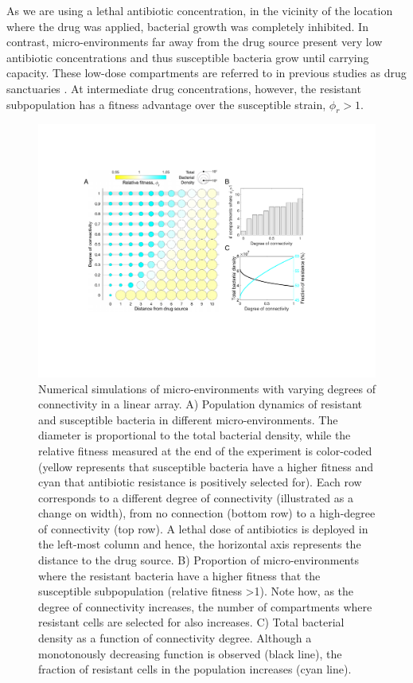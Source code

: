 \documentclass[fleqn,12pt]{wlscirep}
\begin{document}
As we are using a lethal antibiotic concentration, in the vicinity of the location where the drug was applied, bacterial growth was completely inhibited. In contrast, micro-environments far away from the drug source present very low antibiotic concentrations and thus susceptible bacteria grow until carrying capacity. These low-dose compartments are referred to in previous studies as drug sanctuaries \cite{Moreno2015}. At intermediate drug concentrations, however, the resistant subpopulation has a fitness advantage over the susceptible strain, $\phi_r>1$.

\begin{figure}[ht!]
\centering
\includegraphics[width=1\linewidth]{figures/Figure3.pdf}
\caption{\footnotesize Numerical simulations of micro-environments with varying degrees of connectivity in a linear array.  A) Population dynamics of resistant and susceptible bacteria in different micro-environments. The diameter is proportional to the total bacterial density, while the relative fitness measured at the end of the experiment is color-coded (yellow represents that susceptible bacteria have a higher fitness and cyan that antibiotic resistance is positively selected for).  Each row corresponds to a different degree of connectivity (illustrated as a change on width), from no connection (bottom row) to a high-degree of connectivity (top row).  A lethal dose of antibiotics is deployed in the left-most column and hence, the horizontal axis represents the distance to the drug source. B) Proportion of micro-environments where the resistant bacteria have a higher fitness that the susceptible subpopulation (relative fitness >1). Note how, as the degree of connectivity increases, the number of compartments where resistant cells are selected for also increases. C) Total bacterial density as a function of connectivity degree. Although a monotonously decreasing function is observed (black line), the fraction of resistant cells in the population increases (cyan line). }
\label{fig:figure3}
\end{figure}
\hspace{20pt}
\end{document}
